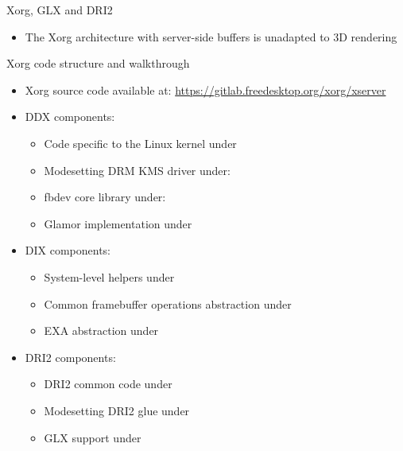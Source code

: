 \begin{frame}{Xorg, GLX and DRI2}
  \begin{itemize}
  \item The Xorg architecture with server-side buffers is unadapted to 3D rendering
  \end{itemize}
\end{frame}

\begin{frame}{Xorg code structure and walkthrough}
  \begin{itemize}
  \item Xorg source code available at: \url{https://gitlab.freedesktop.org/xorg/xserver}
  \item DDX components:
    \begin{itemize}
    \item Code specific to the Linux kernel under 
    \item Modesetting DRM KMS driver under: 
    \item fbdev core library under: 
    \item Glamor implementation under 
    \end{itemize}
  \item DIX components:
    \begin{itemize}
    \item System-level helpers under 
    \item Common framebuffer operations abstraction under 
    \item EXA abstraction under 
    \end{itemize}
  \item DRI2 components:
    \begin{itemize}
    \item DRI2 common code under 
    \item Modesetting DRI2 glue under 
    \item GLX support under 
    \end{itemize}
  \end{itemize}
\end{frame}

